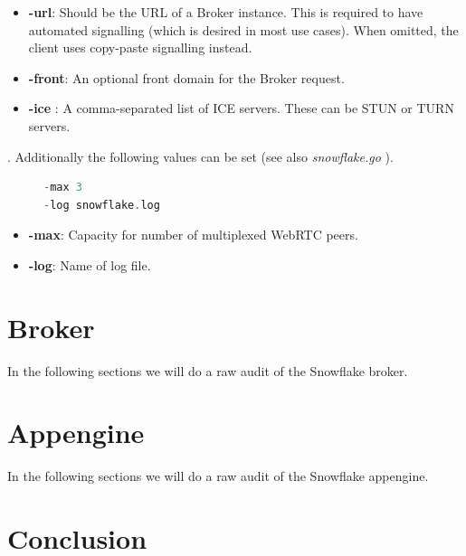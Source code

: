 \documentclass{amsart}
\theoremstyle{definition}
\theoremstyle{remark}
\numberwithin{equation}{section}
\begin{document}
\begin{itemize}
    \item \textbf{-url}: Should be the URL of a Broker instance. This is required to have
automated signalling (which is desired in most use cases).
When omitted, the client uses copy-paste signalling instead.
    \item \textbf{-front}: An optional front domain for the Broker request.
    \item \textbf{-ice }: A comma-separated list of ICE servers. These can be STUN or TURN
servers.
\end{itemize}

. Additionally the following values can be set (see also \textit{snowflake.go} \cite{SnowflakeGitClient}).

\begin{figure}[H]
\begin{lstlisting}[frame=single, language=C, caption=torrc-Config: Snowflake client additional values]
-max 3
-log snowflake.log
\end{lstlisting}
\label{fig:torrcconfigsnowflakeclientadditional}
\end{figure}

\begin{itemize}
    \item \textbf{-max}: Capacity for number of multiplexed WebRTC peers.
    \item \textbf{-log}: Name of log file.
\end{itemize}
\section{Broker}
\label{s:broker}
In the following sections we will do a raw audit of the Snowflake broker.
\section{Appengine}
\label{s:appengine}
In the following sections we will do a raw audit of the Snowflake appengine.
\section{Conclusion}
\label{s:conclusion}
\nocite{*}
%


\end{document}
